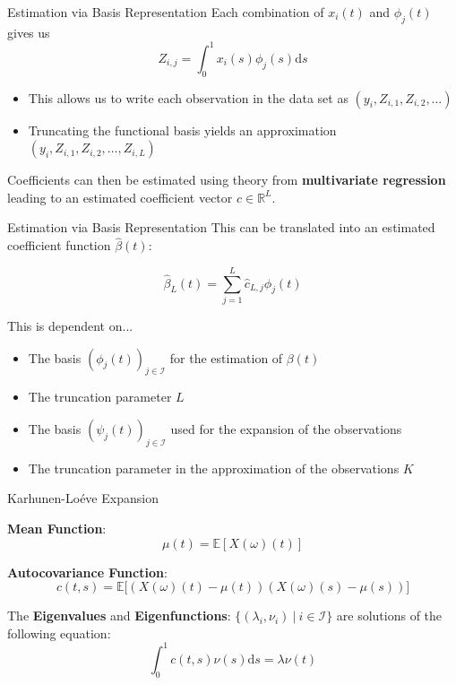 \documentclass{beamer}
\begin{document}
	\begin{frame}{Estimation via Basis Representation}
		Each combination of $x_i(t)$ and $\phi_j(t)$ gives us
		$$Z_{i,j} = \int_{0}^{1} x_i(s) \phi_j(s)\mathrm{d}s$$
		
		\begin{itemize}
			\item This allows us to write each observation in the data set as $\left(y_i, Z_{i,1}, Z_{i,2}, \dots \right)$
			\item Truncating the functional basis yields an approximation $\left(y_i, Z_{i,1}, Z_{i,2}, \dots, Z_{i,L}\right)$
		\end{itemize}
		
		Coefficients can then be estimated using theory from \textbf{multivariate regression} leading to an estimated coefficient vector $\hat{c} \in \mathbb{R}^L$.
	\end{frame}

	\begin{frame}{Estimation via Basis Representation}
		This can be translated into an estimated coefficient function $\hat{\beta}(t)$:
		
		$$\hat{\beta}_L(t) = \sum_{j = 1}^{L} \hat{c}_{L,j} \phi_j(t)$$
	
		This is dependent on...
		\begin{itemize}
			\item The basis $(\phi_j(t))_{j \in \mathcal{I}}$ for the estimation of $\beta(t)$
			\item The truncation parameter $L$
			\item The basis $(\psi_j(t))_{j \in \mathcal{I}}$ used for the expansion of the observations
			\item The truncation parameter in the approximation of the observations $K$
		\end{itemize}
	\end{frame}
	



	\begin{frame}{Karhunen-Lo\'{e}ve Expansion}
		
		\textbf{Mean Function}: $$\mu(t) = \mathbb{E}\left[ X(\omega)(t) \right]$$

		\textbf{Autocovariance Function}: $$c(t,s) = \mathbb{E}\big[ \left( X(\omega)(t) - \mu(t) \right) \left( X(\omega)(s) - \mu(s) \right) \big]$$
		
		The \textbf{Eigenvalues} and \textbf{Eigenfunctions}: $\{(\lambda_i, \nu_i) \: \vert \: i \in \mathcal{I}\}$  are solutions of the following equation:
		$$ \int_{0}^{1}c(t,s)\nu(s) \mathrm{d}s = \lambda \nu(t) $$
	\end{frame}
	
\end{document}
